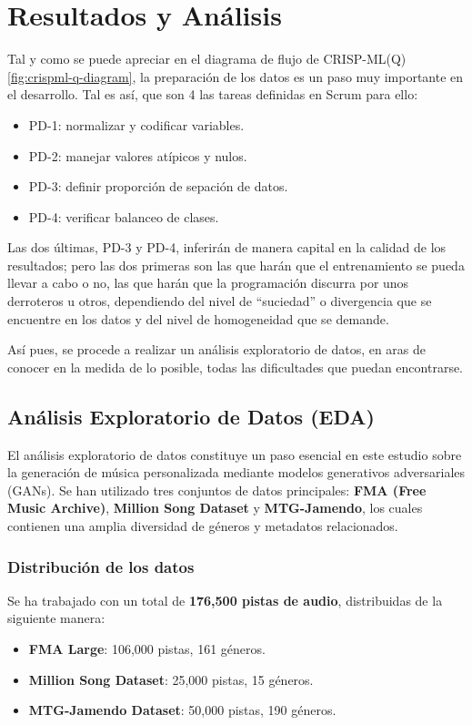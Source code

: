 \chapter{Resultados y Análisis}

Tal y como se puede apreciar en el diagrama de flujo de CRISP-ML(Q) \ref{fig:crispml-q-diagram}, la preparación de los datos es un paso muy importante en el desarrollo. Tal es así, que son 4 las tareas definidas en Scrum para ello:
\begin{itemize}
    \item PD-1: normalizar y codificar variables.
    \item PD-2: manejar valores atípicos y nulos.
    \item PD-3: definir proporción de sepación de datos.
    \item PD-4: verificar balanceo de clases.
\end{itemize}

Las dos últimas, PD-3 y PD-4, inferirán de manera capital en la calidad de los resultados; pero las dos primeras son las que harán que el entrenamiento se pueda llevar a cabo o no, las que harán que la programación discurra por unos derroteros u otros, dependiendo del nivel de ``suciedad'' o divergencia que se encuentre en los datos y del nivel de homogeneidad que se demande.

Así pues, se procede a realizar un análisis exploratorio de datos, en aras de conocer en la medida de lo posible, todas las dificultades que puedan encontrarse.

\section{Análisis Exploratorio de Datos (EDA)}

El análisis exploratorio de datos constituye un paso esencial en este estudio sobre la generación de música personalizada mediante modelos generativos adversariales (GANs). Se han utilizado tres conjuntos de datos principales: \textbf{FMA (Free Music Archive)}, \textbf{Million Song Dataset} y \textbf{MTG-Jamendo}, los cuales contienen una amplia diversidad de géneros y metadatos relacionados.

\subsection{Distribución de los datos}
Se ha trabajado con un total de \textbf{176,500 pistas de audio}, distribuidas de la siguiente manera:
\begin{itemize}
\item \textbf{FMA Large}: 106,000 pistas, 161 géneros.
\item \textbf{Million Song Dataset}: 25,000 pistas, 15 géneros.
\item \textbf{MTG-Jamendo Dataset}: 50,000 pistas, 190 géneros.
\end{itemize}

